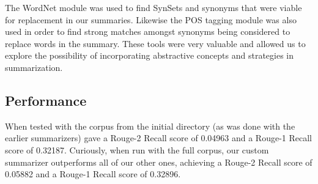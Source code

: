 \documentclass[11pt,letterpaper]{article}
\begin{document}
The WordNet module was used to find SynSets and synonyms that were viable for replacement in our summaries. Likewise the POS tagging module was also used in order to find strong matches amongst synonyms being considered to replace words in the summary. These tools were very valuable and allowed us to explore the possibility of incorporating abstractive concepts and strategies in summarization.

\subsection{Performance}
When tested with the corpus from the initial directory (as was done with the earlier summarizers) gave a Rouge-2 Recall score of 0.04963 and a Rouge-1 Recall score of 0.32187. Curiously, when run with the full corpus, our custom summarizer outperforms all of our other ones, achieving a Rouge-2 Recall score of 0.05882 and a Rouge-1 Recall score of 0.32896.
\end{document}
